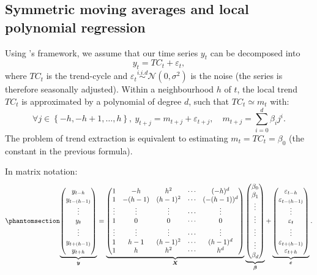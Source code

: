 \documentclass[
]{article}
\newcommand\1{\mathds{1}}
\begin{document}
\subsection{Symmetric moving averages and local polynomial
regression}\label{sec-sym-lp}

Using \textcite{proietti2008}'s framework, we assume that our time
series \(y_t\) can be decomposed into \[
y_t=TC_t+\varepsilon_t,
\] where \(TC_t\) is the trend-cycle and
\(\varepsilon_{t}\overset{i.i.d}{\sim}\mathcal{N}(0,\sigma^{2})\) is the
noise (the series is therefore seasonally adjusted). Within a
neighbourhood \(h\) of \(t\), the local trend \(TC_t\) is approximated
by a polynomial of degree \(d\), such that \(TC_t\simeq m_{t}\) with: \[
\forall j\in\left\{-h,-h+1,\dots,h\right\},\:
y_{t+j}=m_{t+j}+\varepsilon_{t+j},\quad m_{t+j}=\sum_{i=0}^{d}\beta_{i}j^{i}.
\] The problem of trend extraction is equivalent to estimating
\(m_t=TC_t=\beta_0\) (the constant in the previous formula).

In matrix notation: \begin{equation}\phantomsection\label{eq-lpp}{
\underbrace{\begin{pmatrix}y_{t-h}\\
y_{t-(h-1)}\\
\vdots\\
y_{t}\\
\vdots\\
y_{t+(h-1)}\\
y_{t+h}
\end{pmatrix}}_{\boldsymbol y}=\underbrace{\begin{pmatrix}1 & -h & h^{2} & \cdots & (-h)^{d}\\
1 & -(h-1) & (h-1)^{2} & \cdots & (-(h-1))^{d}\\
\vdots & \vdots & \vdots & \cdots & \vdots\\
1 & 0 & 0 & \cdots & 0\\
\vdots & \vdots & \vdots & \cdots & \vdots\\
1 & h-1 & (h-1)^{2} & \cdots & (h-1)^{d}\\
1 & h & h^{2} & \cdots & h^{d}
\end{pmatrix}}_{\boldsymbol X}\underbrace{\begin{pmatrix}\beta_{0}\\
\beta_{1}\\
\vdots\\
\vdots\\
\vdots\\
\vdots\\
\beta_{d}
\end{pmatrix}}_{\boldsymbol \beta}+\underbrace{\begin{pmatrix}\varepsilon_{t-h}\\
\varepsilon_{t-(h-1)}\\
\vdots\\
\varepsilon_{t}\\
\vdots\\
\varepsilon_{t+(h-1)}\\
\varepsilon_{t+h}
\end{pmatrix}}_{\boldsymbol \varepsilon}.
}\end{equation}
\end{document}

